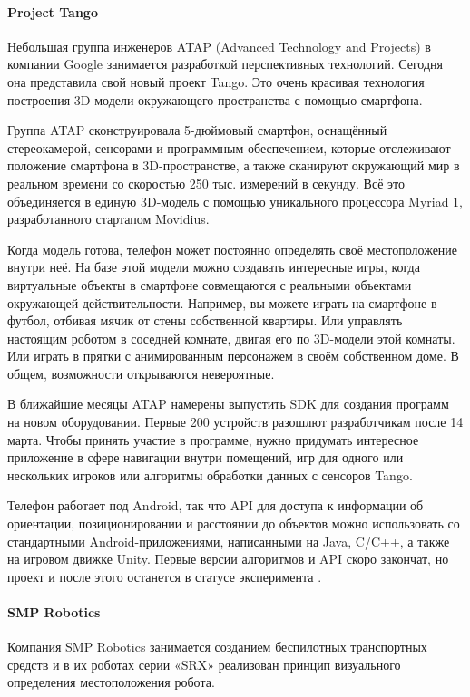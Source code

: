 \paragraph{Project Tango}
Небольшая группа инженеров ATAP (Advanced Technology and Projects) в компании Google занимается разработкой перспективных технологий. Сегодня она представила свой новый проект Tango. Это очень красивая технология построения 3D-модели окружающего пространства с помощью смартфона.

Группа ATAP сконструировала 5-дюймовый смартфон, оснащённый стереокамерой, сенсорами и программным обеспечением, которые отслеживают положение смартфона в 3D-пространстве, а также сканируют окружающий мир в реальном времени со скоростью 250 тыс. измерений в секунду. Всё это объединяется в единую 3D-модель с помощью уникального процессора Myriad 1, разработанного стартапом Movidius.

Когда модель готова, телефон может постоянно определять своё местоположение внутри неё. На базе этой модели можно создавать интересные игры, когда виртуальные объекты в смартфоне совмещаются с реальными объектами окружающей действительности. Например, вы можете играть на смартфоне в футбол, отбивая мячик от стены собственной квартиры. Или управлять настоящим роботом в соседней комнате, двигая его по 3D-модели этой комнаты. Или играть в прятки с анимированным персонажем в своём собственном доме. В общем, возможности открываются невероятные.

В ближайшие месяцы ATAP намерены выпустить SDK для создания программ на новом оборудовании. Первые 200 устройств разошлют разработчикам после 14 марта. Чтобы принять участие в программе, нужно придумать интересное приложение в сфере навигации внутри помещений, игр для одного или нескольких игроков или алгоритмы обработки данных с сенсоров Tango.

Телефон работает под Android, так что API для доступа к информации об ориентации, позиционировании и расстоянии до объектов можно использовать со стандартными Android-приложениями, написанными на Java, C/C++, а также на игровом движке Unity. Первые версии алгоритмов и API скоро закончат, но проект и после этого останется в статусе эксперимента \cite{habrTango}\cite{googleTango}.

\paragraph{SMP Robotics}
Компания SMP Robotics занимается созданием беспилотных транспортных средств и в их роботах серии «SRX» реализован принцип визуального определения местоположения робота.

